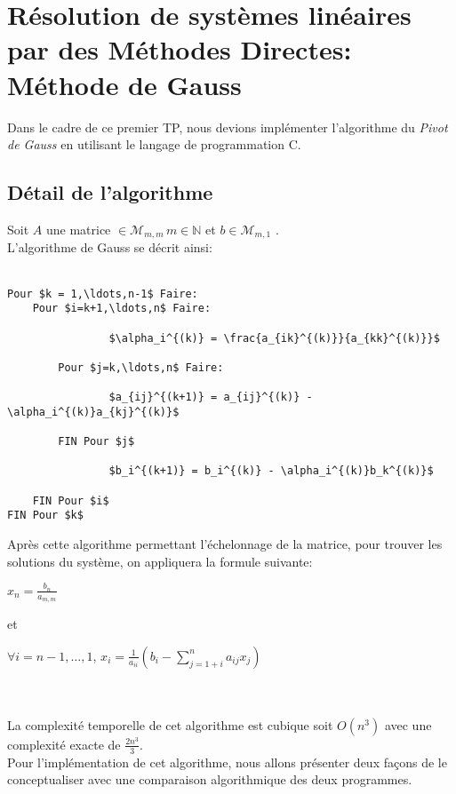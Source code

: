 \chapter{Résolution de systèmes linéaires par des Méthodes Directes: Méthode de Gauss}
Dans le cadre de ce premier TP, nous devions implémenter l'algorithme du \emph{Pivot de Gauss} en utilisant le langage de programmation C.
\section{Détail de l'algorithme}
Soit $A$ une matrice $ \in \mathcal{M}_{m,m}\,m \in \mathbb{N}$ et $b \in \mathcal{M}_{m,1}$ . \\
L'algorithme de Gauss se décrit ainsi: \\ \\
\begin{lstlisting}[mathescape=true]
Pour $k = 1,\ldots,n-1$ Faire:
	Pour $i=k+1,\ldots,n$ Faire:

				$\alpha_i^{(k)} = \frac{a_{ik}^{(k)}}{a_{kk}^{(k)}}$ 
		
		Pour $j=k,\ldots,n$ Faire:

		   		$a_{ij}^{(k+1)} = a_{ij}^{(k)} - \alpha_i^{(k)}a_{kj}^{(k)}$
	
		FIN Pour $j$

				$b_i^{(k+1)} = b_i^{(k)} - \alpha_i^{(k)}b_k^{(k)}$

	FIN Pour $i$
FIN Pour $k$
\end{lstlisting}
Après cette algorithme permettant l'échelonnage de la matrice, pour trouver les solutions du système, on appliquera la formule suivante: \\
\begin{Large}
$ x_n = \frac{b_n}{a_{m,m}}$ \\
\end{Large}
\Large{et} \\ 
\begin{Large}
$ \forall i = n-1, \ldots, 1$, $x_i = \frac{1}{a_{ii}}\left( b_i-\sum\limits_{j=1+i}^n a_{ij}x_j \right)$
\end{Large} \\ \\
\normalsize
La complexité temporelle de cet algorithme est cubique soit $O(n^3)$ avec une complexité exacte de $\frac{2n^3}{3}$. \\
Pour l'implémentation de cet algorithme, nous allons présenter deux façons de le conceptualiser avec une comparaison algorithmique des deux programmes. \\
